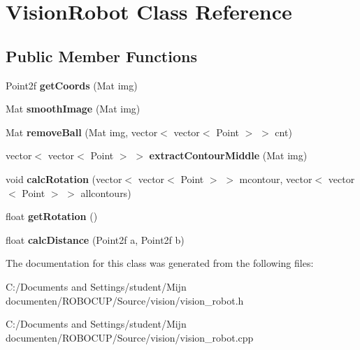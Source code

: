 \hypertarget{class_vision_robot}{\section{Vision\-Robot Class Reference}
\label{class_vision_robot}
}
\subsection*{Public Member Functions}
\begin{DoxyCompactItemize}
\item 
\hypertarget{class_vision_robot_aebb6c1f2f3673477dcf39beae5f170b8}{Point2f {\bfseries get\-Coords} (Mat img)}\label{class_vision_robot_aebb6c1f2f3673477dcf39beae5f170b8}

\item 
\hypertarget{class_vision_robot_aabf0e3b383bf23270fa4172a38e010a4}{Mat {\bfseries smooth\-Image} (Mat img)}\label{class_vision_robot_aabf0e3b383bf23270fa4172a38e010a4}

\item 
\hypertarget{class_vision_robot_a3a65db341da2ffa1d41fb57c897b6c6f}{Mat {\bfseries remove\-Ball} (Mat img, vector$<$ vector$<$ Point $>$ $>$ cnt)}\label{class_vision_robot_a3a65db341da2ffa1d41fb57c897b6c6f}

\item 
\hypertarget{class_vision_robot_a727718ff1678d0aec9114edddb45bc2f}{vector$<$ vector$<$ Point $>$ $>$ {\bfseries extract\-Contour\-Middle} (Mat img)}\label{class_vision_robot_a727718ff1678d0aec9114edddb45bc2f}

\item 
\hypertarget{class_vision_robot_abae24436c267159329c2163109a4a481}{void {\bfseries calc\-Rotation} (vector$<$ vector$<$ Point $>$ $>$ mcontour, vector$<$ vector$<$ Point $>$ $>$ allcontours)}\label{class_vision_robot_abae24436c267159329c2163109a4a481}

\item 
\hypertarget{class_vision_robot_a136795e47a75ffe2c2ab732521d4847e}{float {\bfseries get\-Rotation} ()}\label{class_vision_robot_a136795e47a75ffe2c2ab732521d4847e}

\item 
\hypertarget{class_vision_robot_ab635281831b896186b14ef6af2a4892d}{float {\bfseries calc\-Distance} (Point2f a, Point2f b)}\label{class_vision_robot_ab635281831b896186b14ef6af2a4892d}

\end{DoxyCompactItemize}


The documentation for this class was generated from the following files\-:\begin{DoxyCompactItemize}
\item 
C\-:/\-Documents and Settings/student/\-Mijn documenten/\-R\-O\-B\-O\-C\-U\-P/\-Source/vision/vision\-\_\-robot.\-h\item 
C\-:/\-Documents and Settings/student/\-Mijn documenten/\-R\-O\-B\-O\-C\-U\-P/\-Source/vision/vision\-\_\-robot.\-cpp\end{DoxyCompactItemize}

